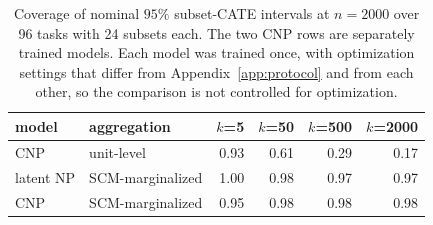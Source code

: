 \begin{table}[tp]
\centering
\footnotesize
\setlength{\tabcolsep}{4pt}
\begin{tabular}{llrrrr}
\toprule
\textbf{model} & \textbf{aggregation} & \textbf{$k$=5} & \textbf{$k$=50} & \textbf{$k$=500} & \textbf{$k$=2000} \\
\midrule
CNP & unit-level & 0.93 & 0.61 & 0.29 & 0.17 \\
latent NP & SCM-marginalized & 1.00 & 0.98 & 0.97 & 0.97 \\
CNP & SCM-marginalized & 0.95 & 0.98 & 0.98 & 0.98 \\
\bottomrule
\end{tabular}
\caption{Coverage of nominal $95\%$ subset-CATE intervals at $n=2000$ over 96 tasks with 24 subsets each. The two CNP rows are separately trained models. Each model was trained once, with optimization settings that differ from Appendix~\ref{app:protocol} and from each other, so the comparison is not controlled for optimization.}
\label{tab:n2000}
\end{table}
